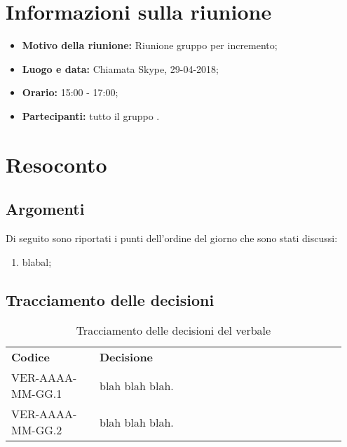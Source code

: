 \documentclass[VER-2018-04-29.tex]{subfiles}
\begin{document}
\chapter{Informazioni sulla riunione}
\begin{itemize}
	\item \textbf{Motivo della riunione:} Riunione gruppo per incremento;
	\item \textbf{Luogo e data:} Chiamata Skype, 29-04-2018;
	\item \textbf{Orario:} 15:00 - 17:00;
	\item \textbf{Partecipanti:} tutto il gruppo \gruppo.
\end{itemize}



\chapter{Resoconto}
\section{Argomenti}
Di seguito sono riportati i punti dell'ordine del giorno che sono stati discussi:
\begin{enumerate}
	\item blabal;
\end{enumerate}
\section{Tracciamento delle decisioni}
\begin{table}[H]
	\begin{center}
		\begin{tabu} to 
			\tableHeaderStyle
			\textbf{Codice} & \textbf{Decisione} \\
			VER-AAAA-MM-GG.1 & blah blah blah. \\
			VER-AAAA-MM-GG.2 & blah blah blah. \\
		\end{tabu}
		\caption{Tracciamento delle decisioni del verbale}
	\end{center}
\end{table}
\end{document}
